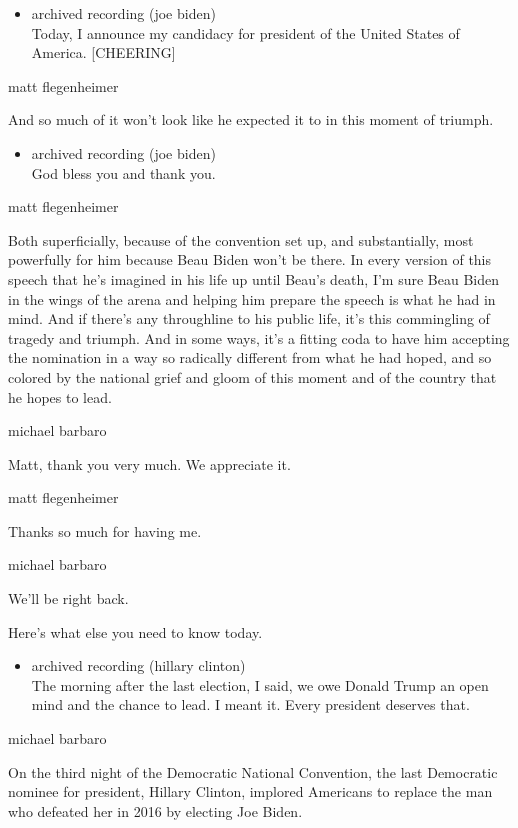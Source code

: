 \begin{itemize}
\tightlist
\item
  archived recording (joe biden)\\
  Today, I announce my candidacy for president of the United States of
  America. {[}CHEERING{]}
\end{itemize}

matt flegenheimer

And so much of it won't look like he expected it to in this moment of
triumph.

\begin{itemize}
\tightlist
\item
  archived recording (joe biden)\\
  God bless you and thank you.
\end{itemize}

matt flegenheimer

Both superficially, because of the convention set up, and substantially,
most powerfully for him because Beau Biden won't be there. In every
version of this speech that he's imagined in his life up until Beau's
death, I'm sure Beau Biden in the wings of the arena and helping him
prepare the speech is what he had in mind. And if there's any
throughline to his public life, it's this commingling of tragedy and
triumph. And in some ways, it's a fitting coda to have him accepting the
nomination in a way so radically different from what he had hoped, and
so colored by the national grief and gloom of this moment and of the
country that he hopes to lead.

michael barbaro

Matt, thank you very much. We appreciate it.

matt flegenheimer

Thanks so much for having me.

michael barbaro

We'll be right back.

Here's what else you need to know today.

\begin{itemize}
\tightlist
\item
  archived recording (hillary clinton)\\
  The morning after the last election, I said, we owe Donald Trump an
  open mind and the chance to lead. I meant it. Every president deserves
  that.
\end{itemize}

michael barbaro

On the third night of the Democratic National Convention, the last
Democratic nominee for president, Hillary Clinton, implored Americans to
replace the man who defeated her in 2016 by electing Joe Biden.

